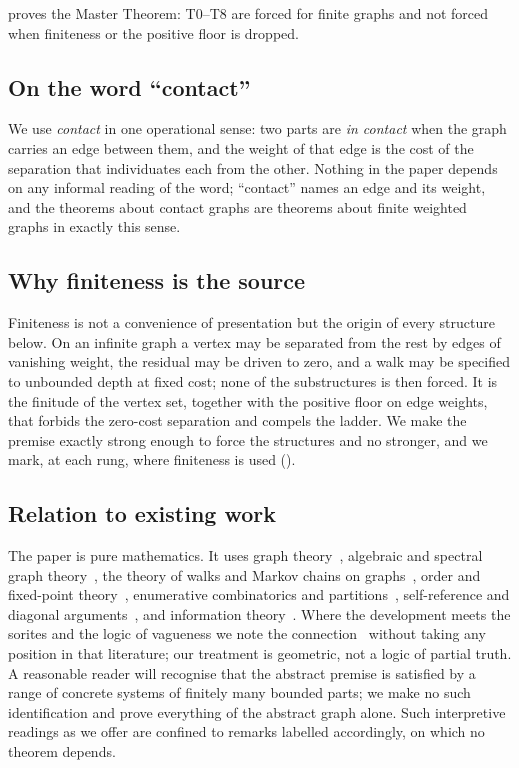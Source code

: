 \documentclass[11pt,a4paper]{article}
\theoremstyle{thmstyle}
\theoremstyle{definition}
\theoremstyle{remark}
\begin{document}
 proves the Master Theorem: T0--T8 are forced for finite
graphs and not forced when finiteness or the positive floor is dropped.

\subsection{On the word ``contact''}

We use \emph{contact} in one operational sense: two parts are \emph{in contact}
when the graph carries an edge between them, and the weight of that edge is the
cost of the separation that individuates each from the other. Nothing in the
paper depends on any informal reading of the word; ``contact'' names an edge and
its weight, and the theorems about contact graphs are theorems about finite
weighted graphs in exactly this sense.

\subsection{Why finiteness is the source}

Finiteness is not a convenience of presentation but the origin of every
structure below. On an infinite graph a vertex may be separated from the rest by
edges of vanishing weight, the residual may be driven to zero, and a walk may be
specified to unbounded depth at fixed cost; none of the substructures is then
forced. It is the finitude of the vertex set, together with the positive floor
on edge weights, that forbids the zero-cost separation and compels the ladder.
We make the premise exactly strong enough to force the structures and no
stronger, and we mark, at each rung, where finiteness is used
().

\subsection{Relation to existing work}

The paper is pure mathematics. It uses graph theory~\citep{bondymurty2008,%
diestel2017,west2001,bollobas1998}, algebraic and spectral graph
theory~\citep{godsilroyle2001,chung1997,fiedler1973,cheeger1970}, the theory of
walks and Markov chains on graphs~\citep{lovasz1993,levinperes2017}, order and
fixed-point theory~\citep{daveypriestley2002,birkhoff1967,tarski1955},
enumerative combinatorics and partitions~\citep{stanley2012,andrews1976},
self-reference and diagonal arguments~\citep{russell1903,cantor1891,lawvere1969,%
godel1931}, and information theory~\citep{shannon1948,cover2006}. Where the
development meets the sorites and the logic of vagueness we note the
connection~\citep{black1937,williamson1994} without taking any position in that
literature; our treatment is geometric, not a logic of partial truth. A
reasonable reader will recognise that the abstract premise is satisfied by a
range of concrete systems of finitely many bounded parts; we make no such
identification and prove everything of the abstract graph alone. Such
interpretive readings as we offer are confined to remarks labelled accordingly,
on which no theorem depends.
\end{document}
